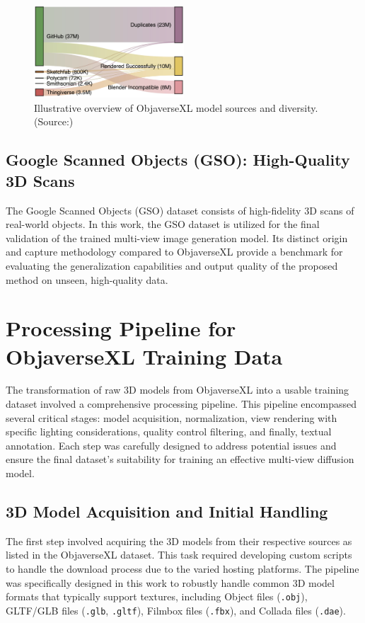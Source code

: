 \begin{figure}[h]
  \centering
  \includegraphics[width=0.5\textwidth]{images/data/sankey-diagram-objaverse-sources.jpeg}
  \caption{Illustrative overview of ObjaverseXL model sources and diversity. (Source:\cite{objaversexl})}
  \label{fig:objaversexl-overview}
\end{figure}

\subsection{Google Scanned Objects (GSO): High-Quality 3D Scans}\label{ssec:gso-overview}
The Google Scanned Objects (GSO) dataset \cite{gso} consists of high-fidelity 3D scans of real-world objects. In this work, the GSO dataset is utilized for the final validation of the trained multi-view image generation model. Its distinct origin and capture methodology compared to ObjaverseXL provide a benchmark for evaluating the generalization capabilities and output quality of the proposed method on unseen, high-quality data.

\section{Processing Pipeline for ObjaverseXL Training Data}\label{sec:objaversexl-pipeline}
The transformation of raw 3D models from ObjaverseXL into a usable training dataset involved a comprehensive processing pipeline. This pipeline encompassed several critical stages: model acquisition, normalization, view rendering with specific lighting considerations, quality control filtering, and finally, textual annotation. Each step was carefully designed to address potential issues and ensure the final dataset's suitability for training an effective multi-view diffusion model.

\subsection{3D Model Acquisition and Initial Handling}\label{ssec:model-acquisition}
The first step involved acquiring the 3D models from their respective sources as listed in the ObjaverseXL dataset. This task required developing custom scripts to handle the download process due to the varied hosting platforms. The pipeline was specifically designed in this work to robustly handle common 3D model formats that typically support textures, including Object files (\texttt{.obj}), GLTF/GLB files (\texttt{.glb}, \texttt{.gltf}), Filmbox files (\texttt{.fbx}), and Collada files (\texttt{.dae}).

